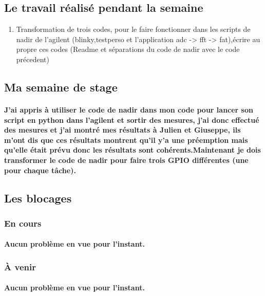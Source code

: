 \documentclass[a4paper]{article}
\begin{document}
 \subsection{Le travail réalisé pendant la semaine}
 \begin{enumerate}
\item {Transformation de trois codes, pour le faire fonctionner dans les scripts de nadir de l'agilent (blinky,testperso et l'application adc -> fft -> fat),écrire au propre ces codes (Readme et séparations du code de nadir avec le code précedent)}
\end{enumerate}

\subsection{Ma semaine de stage}
    \paragraph{J'ai appris à utiliser le code de nadir dans mon code pour lancer son script en python dans l'agilent et sortir des mesures, j'ai donc effectué des mesures et j'ai montré mes résultats à Julien et Giuseppe, ils m'ont dis que ces résultats montrent qu'il y'a une préemption mais qu'elle était prévu donc les résultats sont cohérents.Maintenant je dois transformer le code de nadir pour faire trois GPIO différentes (une pour chaque tâche).}
    
    \subsection{Les blocages}
\subsubsection{En cours}
    \paragraph{Aucun problème en vue pour l'instant.}
\subsubsection{À venir}
    \paragraph{Aucun problème en vue pour l'instant.}
	\paragraph{}
\end{document}
